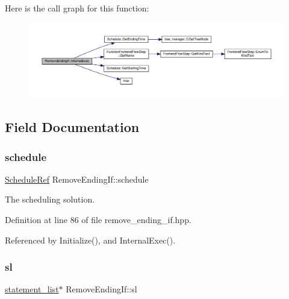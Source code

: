 Here is the call graph for this function\+:
\nopagebreak
\begin{figure}[H]
\begin{center}
\leavevmode
\includegraphics[width=350pt]{d3/d05/classRemoveEndingIf_a22b33df1189bae1af234c829c44b15b2_cgraph}
\end{center}
\end{figure}


\subsection{Field Documentation}
\mbox{\label{classRemoveEndingIf_a3cea7c861318dbdb39b0e617fe9b5456}} 
\subsubsection{\texorpdfstring{schedule}{schedule}}
{\footnotesize\ttfamily \hyperlink{schedule_8hpp_af67f402958b3b52a1ec5cc4ce08ae3b9}{Schedule\+Ref} Remove\+Ending\+If\+::schedule\hspace{0.3cm}{\ttfamily [private]}}



The scheduling solution. 



Definition at line 86 of file remove\+\_\+ending\+\_\+if.\+hpp.



Referenced by Initialize(), and Internal\+Exec().

\mbox{\label{classRemoveEndingIf_a03e48ca6bfca1325ba4ec0efa6de4b07}} 
\subsubsection{\texorpdfstring{sl}{sl}}
{\footnotesize\ttfamily \hyperlink{structstatement__list}{statement\+\_\+list}$\ast$ Remove\+Ending\+If\+::sl\hspace{0.3cm}{\ttfamily [private]}}




